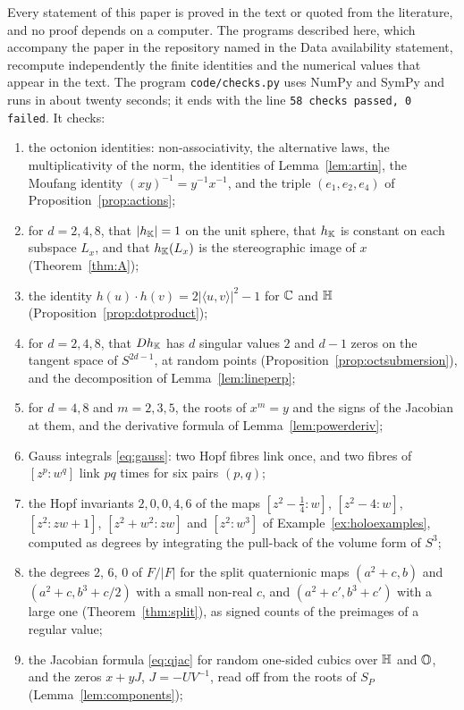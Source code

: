 Every statement of this paper is proved in the text or quoted from the literature, and no proof depends on a computer. The programs described here, which accompany the paper in the repository named in the Data availability statement, recompute independently the finite identities and the numerical values that appear in the text. The program \texttt{code/checks.py} uses NumPy and SymPy and runs in about twenty seconds; it ends with the line \texttt{58 checks passed, 0 failed}. It checks:
\begin{enumerate}[label=(\arabic*)]
\item the octonion identities: non-associativity, the alternative laws, the multiplicativity of the norm, the identities of Lemma~\ref{lem:artin}, the Moufang identity $(xy)^{-1}=y^{-1}x^{-1}$, and the triple $(e_1,e_2,e_4)$ of Proposition~\ref{prop:actions};
\item for $d=2,4,8$, that $|h_{\mathbb{K}}|=1$ on the unit sphere, that $h_{\mathbb{K}}$ is constant on each subspace $L_x$, and that $h_{\mathbb{K}}(L_x)$ is the stereographic image of $x$ (Theorem~\ref{thm:A});
\item the identity $h(u)\cdot h(v)=2|\langle u,v\rangle|^2-1$ for $\mathbb{C}$ and $\mathbb{H}$ (Proposition~\ref{prop:dotproduct});
\item for $d=2,4,8$, that $Dh_{\mathbb{K}}$ has $d$ singular values $2$ and $d-1$ zeros on the tangent space of $S^{2d-1}$, at random points (Proposition~\ref{prop:octsubmersion}), and the decomposition of Lemma~\ref{lem:lineperp};
\item for $d=4,8$ and $m=2,3,5$, the roots of $x^m=y$ and the signs of the Jacobian at them, and the derivative formula of Lemma~\ref{lem:powerderiv};
\item Gauss integrals \eqref{eq:gauss}: two Hopf fibres link once, and two fibres of $[z^p:w^q]$ link $pq$ times for six pairs $(p,q)$;
\item the Hopf invariants $2,0,0,4,6$ of the maps $[z^2-\tfrac14:w]$, $[z^2-4:w]$, $[z^2:zw+1]$, $[z^2+w^2:zw]$ and $[z^2:w^3]$ of Example~\ref{ex:holoexamples}, computed as degrees by integrating the pull-back of the volume form of $S^3$;
\item the degrees $2$, $6$, $0$ of $F/|F|$ for the split quaternionic maps $(a^2+c,b)$ and $(a^2+c,b^3+c/2)$ with a small non-real $c$, and $(a^2+c',b^3+c')$ with a large one (Theorem~\ref{thm:split}), as signed counts of the preimages of a regular value;
\item the Jacobian formula \eqref{eq:qjac} for random one-sided cubics over $\mathbb{H}$ and $\mathbb{O}$, and the zeros $x+yJ$, $J=-UV^{-1}$, read off from the roots of $S_P$ (Lemma~\ref{lem:components});

\end{enumerate}
